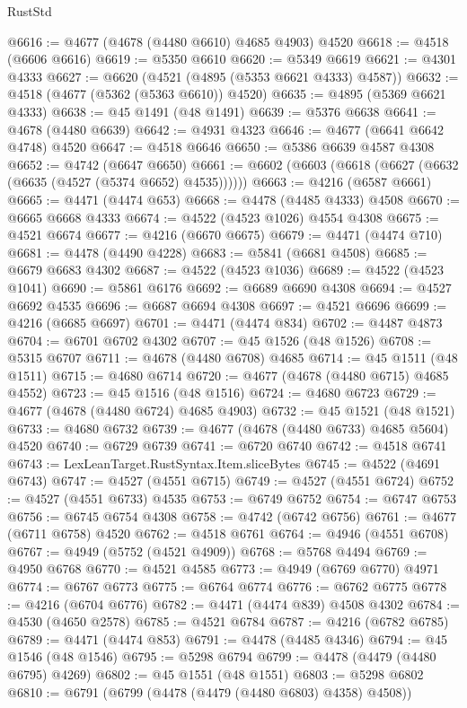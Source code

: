\begin{lexlean}{RustStd}
\begin{coremodule}
@6616 := @4677 (@4678 (@4480 @6610) @4685 @4903) @4520
@6618 := @4518 (@6606 @6616)
@6619 := @5350 @6610
@6620 := @5349 @6619
@6621 := @4301 @4333
@6627 := @6620 (@4521 (@4895 (@5353 @6621 @4333) @4587))
@6632 := @4518 (@4677 (@5362 (@5363 @6610)) @4520)
@6635 := @4895 (@5369 @6621 @4333)
@6638 := @45 @1491 (@48 @1491)
@6639 := @5376 @6638
@6641 := @4678 (@4480 @6639)
@6642 := @4931 @4323
@6646 := @4677 (@6641 @6642 @4748) @4520
@6647 := @4518 @6646
@6650 := @5386 @6639 @4587 @4308
@6652 := @4742 (@6647 @6650)
@6661 := @6602 (@6603 (@6618 (@6627 (@6632 (@6635 (@4527 (@5374 @6652) @4535))))))
@6663 := @4216 (@6587 @6661)
@6665 := @4471 (@4474 @653)
@6668 := @4478 (@4485 @4333) @4508
@6670 := @6665 @6668 @4333
@6674 := @4522 (@4523 @1026) @4554 @4308
@6675 := @4521 @6674
@6677 := @4216 (@6670 @6675)
@6679 := @4471 (@4474 @710)
@6681 := @4478 (@4490 @4228)
@6683 := @5841 (@6681 @4508)
@6685 := @6679 @6683 @4302
@6687 := @4522 (@4523 @1036)
@6689 := @4522 (@4523 @1041)
@6690 := @5861 @6176
@6692 := @6689 @6690 @4308
@6694 := @4527 @6692 @4535
@6696 := @6687 @6694 @4308
@6697 := @4521 @6696
@6699 := @4216 (@6685 @6697)
@6701 := @4471 (@4474 @834)
@6702 := @4487 @4873
@6704 := @6701 @6702 @4302
@6707 := @45 @1526 (@48 @1526)
@6708 := @5315 @6707
@6711 := @4678 (@4480 @6708) @4685
@6714 := @45 @1511 (@48 @1511)
@6715 := @4680 @6714
@6720 := @4677 (@4678 (@4480 @6715) @4685 @4552)
@6723 := @45 @1516 (@48 @1516)
@6724 := @4680 @6723
@6729 := @4677 (@4678 (@4480 @6724) @4685 @4903)
@6732 := @45 @1521 (@48 @1521)
@6733 := @4680 @6732
@6739 := @4677 (@4678 (@4480 @6733) @4685 @5604) @4520
@6740 := @6729 @6739
@6741 := @6720 @6740
@6742 := @4518 @6741
@6743 := LexLeanTarget.RustSyntax.Item.sliceBytes
@6745 := @4522 (@4691 @6743)
@6747 := @4527 (@4551 @6715)
@6749 := @4527 (@4551 @6724)
@6752 := @4527 (@4551 @6733) @4535
@6753 := @6749 @6752
@6754 := @6747 @6753
@6756 := @6745 @6754 @4308
@6758 := @4742 (@6742 @6756)
@6761 := @4677 (@6711 @6758) @4520
@6762 := @4518 @6761
@6764 := @4946 (@4551 @6708)
@6767 := @4949 (@5752 (@4521 @4909))
@6768 := @5768 @4494
@6769 := @4950 @6768
@6770 := @4521 @4585
@6773 := @4949 (@6769 @6770) @4971
@6774 := @6767 @6773
@6775 := @6764 @6774
@6776 := @6762 @6775
@6778 := @4216 (@6704 @6776)
@6782 := @4471 (@4474 @839) @4508 @4302
@6784 := @4530 (@4650 @2578)
@6785 := @4521 @6784
@6787 := @4216 (@6782 @6785)
@6789 := @4471 (@4474 @853)
@6791 := @4478 (@4485 @4346)
@6794 := @45 @1546 (@48 @1546)
@6795 := @5298 @6794
@6799 := @4478 (@4479 (@4480 @6795) @4269)
@6802 := @45 @1551 (@48 @1551)
@6803 := @5298 @6802
@6810 := @6791 (@6799 (@4478 (@4479 (@4480 @6803) @4358) @4508))

\end{coremodule}
\end{lexlean}
